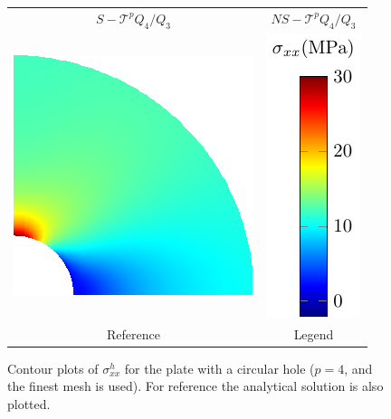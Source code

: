 \begin{figure}[htb!]
\begin{tabular}{cc}
        $S-\mathcal{T}^{p} Q_4/Q_3$                                    & $NS-\mathcal{T}^{p} Q_4/Q_3$                            \\
        \includegraphics[width=.4\linewidth]{reference_stress_contour} & \includegraphics[width=.14\linewidth]{legend}           \\
        Reference                                                      & Legend
    \end{tabular}
    \caption{ Contour plots of $\sigma_{xx}^h$ for the plate with a circular hole ($p=4$, and the finest mesh is used). For reference the analytical solution is also plotted. }
    \label{fig:platewithhole_contour}
\end{figure}

